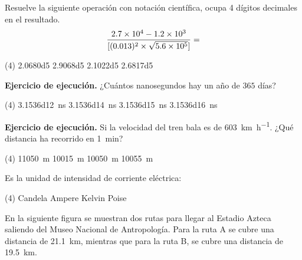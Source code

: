 \documentclass[12pt, letter]{exam}
\begin{document}


\newpage

    \begin{questions}
        \question Resuelve la siguiente operación con notación científica, ocupa 4 dígitos decimales en el resultado.
        \begin{align*}
        \dfrac{\num{2.7d4} - \num{1.2e3}}{[(0.013)^{2}  \times \sqrt{\num{5.6d5}}]} =
        \end{align*}
        \begin{tasks}(4)
            \task \num{2.0680d5}
            \task \num{2.9068d5}
            \task \num{2.1022d5}
            \task \num{2.6817d5}
        \end{tasks}
        \question \textbf{Ejercicio de ejecución.} ¿Cuántos nanosegundos hay un año de $365$ días?
        \begin{tasks}(4)
            \task \SI{3.1536d12}{\nano\second}
            \task \SI{3.1536d14}{\nano\second}
            \task \SI{3.1536d15}{\nano\second}
            \task \SI{3.1536d16}{\nano\second}
        \end{tasks}
        \question \textbf{Ejercicio de ejecución.} Si la velocidad del tren bala es de \SI{603}{\kilo\meter\per\hour}. ¿Qué distancia ha recorrido en \SI{1}{\minute}?
        \begin{tasks}(4)
            \task \SI{11050}{\meter}
            \task \SI{10015}{\meter}
            \task \SI{10050}{\meter}
            \task \SI{10055}{\meter}
        \end{tasks}
        \question Es la unidad de intensidad de corriente eléctrica:
        \begin{tasks}(4)
            \task Candela
            \task Ampere
            \task Kelvin
            \task Poise
        \end{tasks}
        \question En la siguiente figura se muestran dos rutas para llegar al Estadio Azteca saliendo del Museo Nacional de Antropología. Para la ruta A se cubre una distancia de \SI{21.1}{\kilo\meter}, mientras que para la ruta B, se cubre una distancia de \SI{19.5}{\kilo\meter}.
    \begin{figure}[H]
        \centering

\end{figure}
\end{questions}
\end{document}
